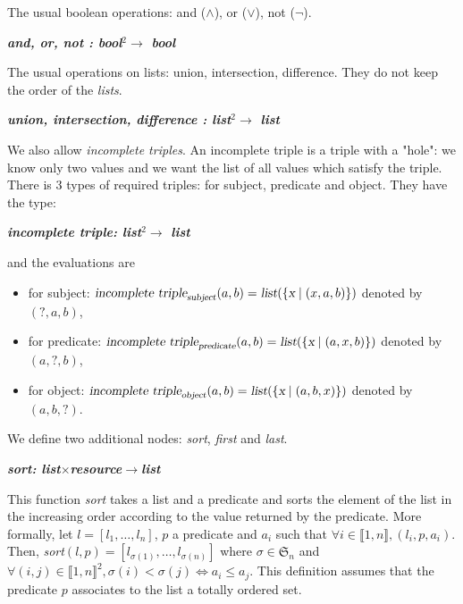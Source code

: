 The usual boolean operations: and ($\wedge$), or ($\vee$), not ($\neg$).

\begin{center}
\textsl{\bf and, or, not : bool$^2\rightarrow$ bool}
\end{center}

\bigskip

The usual operations on lists: union, intersection, difference. They do not keep the order of the \textsl{lists}.

\begin{center}
\textsl{\bf union, intersection, difference : list$^2\rightarrow$ list}
\end{center}

We also allow \textsl{incomplete triples}. An incomplete triple is a triple with a "hole": we know only two values and we want the list of all values which satisfy the triple. There is 3 types of required triples: for subject, predicate and object. They have the type:
\begin{center}
\textsl{\bf incomplete triple: list$^2\rightarrow$ list}
\end{center}
and the evaluations are
\begin{itemize}
    \item for subject: $\textsl{incomplete triple}_{\textsl{subject}}(a,b) = \textsl{list}(\{\textsl{x}\mid(x,a,b)\})$ denoted by $(?,a,b)$,
    \item for predicate: $\textsl{incomplete triple}_{\textsl{predicate}}(a,b) = \textsl{list}(\{\textsl{x}\mid(a,x,b)\})$ denoted by $(a,?,b)$,
    \item for object: $\textsl{incomplete triple}_{\textsl{object}}(a,b) = \textsl{list}(\{\textsl{x}\mid(a,b,x)\})$ denoted by $(a,b,?)$.
\end{itemize}

We define two additional nodes: \textsl{sort}, \textsl{first} and \textsl{last}.

\begin{center}
\textsl{\bf sort: list$\times$resource$\rightarrow$list}
\end{center}
This function \textsl{sort} takes a list and a predicate and sorts the element of the list in the increasing order according to the value returned by the predicate. More formally, let $l=[l_1,\ldots,l_n]$, $p$ a predicate and $a_i$ such that $\forall i\in\llbracket1,n\rrbracket, (l_i,p,a_i)$. Then, \textsl{sort}$(l,p) = [l_{\sigma(1)},\ldots,l_{\sigma(n)}]$ where $\sigma\in\mathfrak{S}_n$ and $\forall (i,j)\in\llbracket 1,n\rrbracket^2, \sigma(i)<\sigma(j) \Leftrightarrow a_i \leqslant a_j$. This definition assumes that the predicate $p$ associates to the list a totally ordered set.


